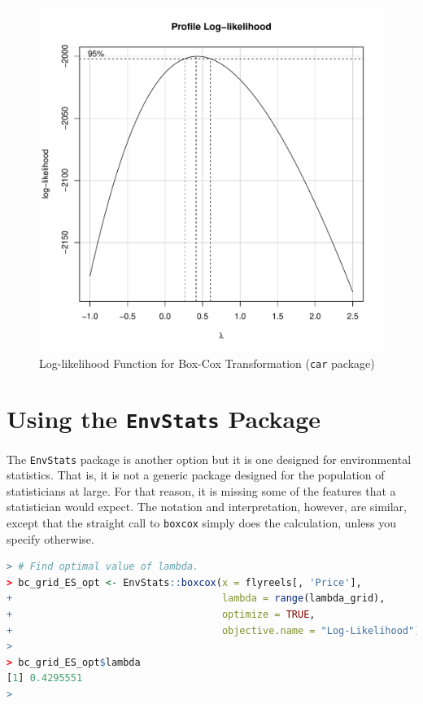 \documentclass[11pt]{book}
\begin{document}
\begin{figure}[h!]
  \centering
  \includegraphics[scale = 0.5, keepaspectratio=true]{../Figures/plot_like_car}
  \caption{Log-likelihood Function for Box-Cox Transformation (\texttt{car} package)} \label{fig:plot_like_car}
\end{figure}


\clearpage
\section*{Using the \texttt{EnvStats} Package}


The \texttt{EnvStats} package is another option
but it is one designed for environmental statistics.
That is, it is not a generic package designed for the population of statisticians at large.
For that reason, it is missing some of the features that
a statistician would expect.
The notation and interpretation, however, are similar, 
except that the straight call to \texttt{boxcox}
simply does the calculation, 
unless you specify otherwise.

\begin{lstlisting}[language=R]
> # Find optimal value of lambda.
> bc_grid_ES_opt <- EnvStats::boxcox(x = flyreels[, 'Price'],
+                                    lambda = range(lambda_grid),
+                                    optimize = TRUE,
+                                    objective.name = "Log-Likelihood")
> 
> bc_grid_ES_opt$lambda
[1] 0.4295551
> 
\end{lstlisting}
\end{document}
